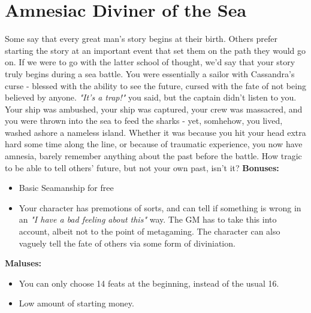 \section{Amnesiac Diviner of the Sea}
Some say that every great man's story begins at their birth. Others prefer starting the story at an important event that set them on the path they would go on. If we were to go with the latter school of thought, we'd say that your story truly begins during a sea battle. You were essentially a sailor with Cassandra's curse - blessed with the ability to see the future, cursed with the fate of not being believed by anyone. \textit{"It's a trap!"} you said, but the captain didn't listen to you. Your ship was ambushed, your ship was captured, your crew was massacred, and you were thrown into the sea to feed the sharks - yet, somhehow, you lived, washed ashore a nameless island. Whether it was because you hit your head extra hard some time along the line, or because of traumatic experience, you now have amnesia, barely remember anything about the past before the battle. How tragic to be able to tell others' future, but not your own past, isn't it?\newline
\textbf{Bonuses:}
\begin{itemize}
	\item Basic Seamanship for free
	\item Your character has premotions of sorts, and can tell if something is wrong in an \textit{"I have a bad feeling about this"} way. The GM has to take this into account, albeit not to the point of metagaming. The character can also vaguely tell the fate of others via some form of diviniation.
\end{itemize}
\textbf{Maluses:}
\begin{itemize}
	\item You can only choose 14 feats at the beginning, instead of the usual 16.
	\item Low amount of starting money.
\end{itemize}
